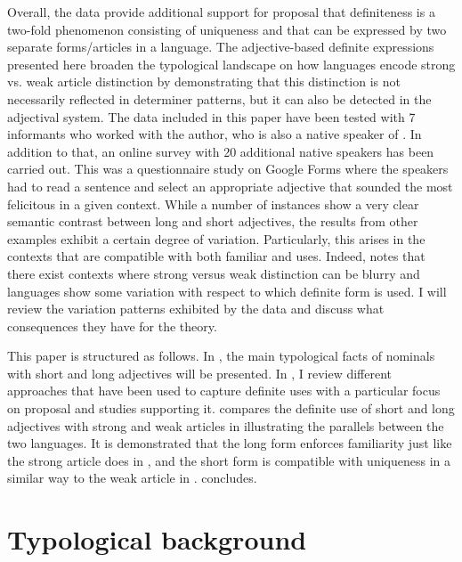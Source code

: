 \documentclass[output=paper,
modfonts
]{langscibook}
\begin{document}
Overall, the  data provide additional support for  proposal that definiteness is a two-fold phenomenon consisting of uniqueness and  that can be expressed by two separate forms/articles in a language. The adjective-based definite expressions presented here broaden the typological landscape on how languages encode strong vs. weak article distinction by demonstrating that this distinction is not necessarily reflected in determiner patterns, but it can also be detected in the adjectival system.
The  data included in this paper have been tested with 7 informants who worked with the author, who is also a native speaker of . In addition to that, an online survey with 20 additional native speakers has been carried out. This was a questionnaire study on Google Forms where the speakers had to read a sentence and select an appropriate adjective that sounded the most felicitous in a given context. While a number of instances show a very clear semantic contrast between long and short adjectives, the results from other examples exhibit a certain degree of variation. Particularly, this arises in the contexts that are compatible with both familiar and  uses. Indeed,  notes that there exist contexts where strong versus weak distinction can be blurry and languages show some variation with respect to which definite form is used. I will review the variation patterns exhibited by the data and discuss what consequences they have for the theory.

This paper is structured as follows. In , the main typological facts of nominals with short and long adjectives will be presented. In , I review different approaches that have been used to capture definite uses with a particular focus on  proposal and studies supporting it.  compares the definite use of short and long adjectives with strong and weak articles in  illustrating the parallels between the two languages. It is demonstrated that the long form enforces familiarity just like the strong article does in , and the short form is compatible with uniqueness in a similar way to the weak article in .  concludes.

\section{Typological background} \label{sec:sereikaite:2} 
\end{document}
